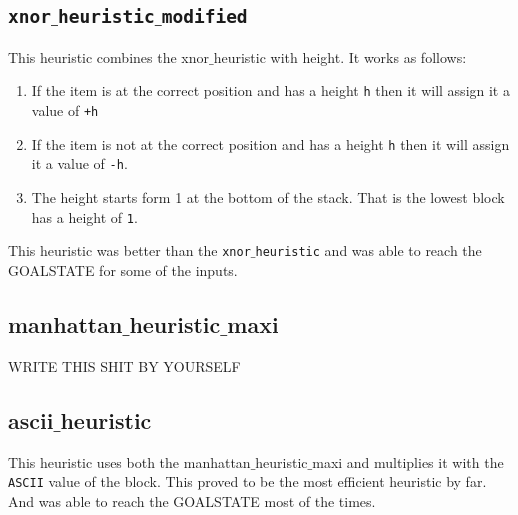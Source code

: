 \documentclass[a4paper,10pt,reqno,oneside]{amsart}
\begin{document}
\subsection*{\texttt{xnor$\_$heuristic$\_$modified}}
This heuristic combines the xnor$\_$heuristic with height.
It works as follows:
\begin{enumerate}
    \item If the item is at the correct position and has a height \texttt{h} then it will assign it a value of \texttt{+h}
    \item If the item is not at the correct position and has a height \texttt{h} then it will assign it a value of \texttt{-h}.
    \item The height starts form 1 at the bottom of the stack. That is the lowest block has a height of \texttt{1}.
\end{enumerate}
\newline
This heuristic was better than the \texttt{xnor$\_$heuristic} and was able to reach the GOALSTATE for some of the inputs.

\subsection*{manhattan$\_$heuristic$\_$maxi}
\begin{Huge}
    WRITE THIS SHIT BY YOURSELF
\end{Huge}

\subsection*{ascii$\_$heuristic}
This heuristic uses both the manhattan$\_$heuristic$\_$maxi and multiplies it with the \texttt{ASCII} value of the block. This proved to be the most efficient heuristic
 by far. And was able to reach the GOALSTATE most of the times.
\end{document}
